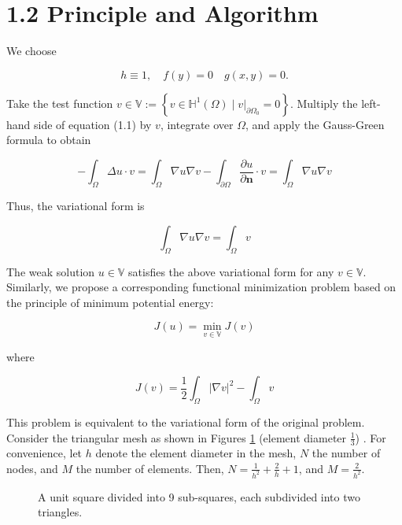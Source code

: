 \documentclass{article}
\begin{document}
\section*{1.2 Principle and Algorithm}
We choose

$$
h \equiv 1, \quad f(y)=0\quad g(x, y)=0.
$$

Take the test function $v \in \mathbb{V}:=\left\{v \in \mathbb{H}^{1}(\Omega) \mid v|_{\partial \Omega_{0}}=0\right\}$. Multiply the left-hand side of equation (1.1) by $v$, integrate over $\Omega$, and apply the Gauss-Green formula to obtain

$$
-\int_{\Omega} \Delta u \cdot v=\int_{\Omega} \nabla u \nabla v-\int_{\partial \Omega} \frac{\partial u}{\partial \boldsymbol{n}} \cdot v=\int_{\Omega} \nabla u \nabla v
$$

Thus, the variational form is

\begin{equation*}
\int_{\Omega} \nabla u \nabla v=\int_{\Omega} v
\end{equation*}

The weak solution $u \in \mathbb{V}$ satisfies the above variational form for any $v \in \mathbb{V}$.\\
Similarly, we propose a corresponding functional minimization problem based on the principle of minimum potential energy:

$$
J(u)=\min_{v \in \mathbb{V}} J(v)
$$

where

$$
J(v)=\frac{1}{2} \int_{\Omega}|\nabla v|^{2}-\int_{\Omega} v
$$

This problem is equivalent to the variational form of the original problem.\\
Consider the triangular mesh as shown in Figures \ref{fig:mesh} (element diameter $\frac{1}{3}$) . For convenience, let $h$ denote the element diameter in the mesh, $N$ the number of nodes, and $M$ the number of elements. Then, $N=\frac{1}{h^{2}}+\frac{2}{h}+1$, and $M=\frac{2}{h^{2}}$.

\begin{figure}[h]
    \centering
    \caption{A unit square divided into 9 sub-squares, each subdivided into two triangles.}
    \label{fig:mesh}
\end{figure}
\end{document}
